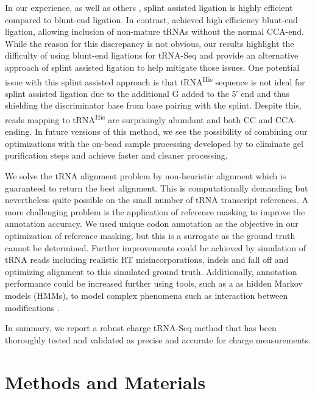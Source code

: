 \documentclass[9pt,lineno]{elife}
\begin{document}
In our experience, as well as others \citep{Shigematsu2017-tv}, splint assisted ligation is highly efficient compared to blunt-end ligation.
In contrast, \cite{Behrens2021-gb} achieved high efficiency blunt-end ligation, allowing inclusion of non-mature tRNAs without the normal CCA-end. While the reason for this discrepancy is not obvious, our results highlight the difficulty of using blunt-end ligations for tRNA-Seq and provide an alternative approach of splint assisted ligation to help mitigate those issues. One potential issue with this splint assisted approach is that tRNA\textsuperscript{His} sequence is not ideal for splint assisted ligation due to the additional G added to the 5′ end \citep{Heinemann2012-hq} and thus shielding the discriminator base from base pairing with the splint.
Despite this, reads mapping to tRNA\textsuperscript{His} are surprisingly abundant and both CC and CCA-ending.
In future versions of this method, we see the possibility of combining our optimizations with the on-bead sample processing developed by \cite{Watkins2022-er} to eliminate gel purification steps and achieve faster and cleaner processing.

We solve the tRNA alignment problem by non-heuristic alignment which is guaranteed to return the best alignment.
This is computationally demanding but nevertheless quite possible on the small number of tRNA transcript references.
A more challenging problem is the application of reference masking to improve the annotation accuracy.
We used unique codon annotation as the objective in our optimization of reference masking, but this is a surrogate as the ground truth cannot be determined.
Further improvements could be achieved by simulation of tRNA reads including realistic RT misincorporations, indels and fall off and optimizing alignment to this simulated ground truth.
Additionally, annotation performance could be increased further using tools, such as a as hidden Markov models (HMMs), to model complex phenomena such as interaction between modifications \citep{Wang2021-fc, Hernandez-Alias2022-ch}.

In summary, we report a robust charge tRNA-Seq method that has been thoroughly tested and validated as precise and accurate for charge measurements.






\section{Methods and Materials}
\end{document}

